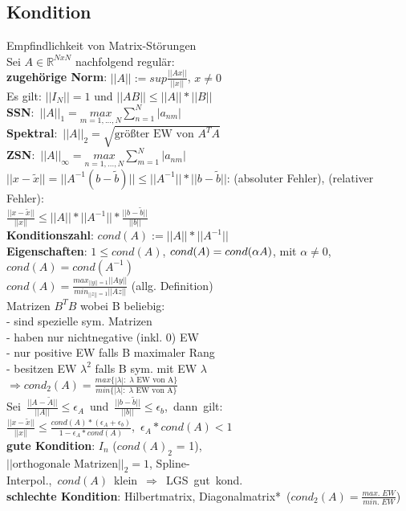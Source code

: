 \subsection{Kondition}
Empfindlichkeit von Matrix-Störungen\\
Sei $A \in \mathbb{R}^{NxN}$ nachfolgend regulär:\\
\textbf{zugehörige Norm}: $||A|| := sup\frac{||Ax||}{||x||}$, $x \neq 0$\\
Es gilt: $||I_N|| = 1$ und $||AB|| \leq ||A|| * ||B||$\\
\mbox{\textbf{SSN}: $||A||_1 = \underset{m = 1,...,N}{max}\sum_{n=1}^N|a_{nm}|$}\\
\mbox{\textbf{Spektral}: $||A||_2 = \sqrt{\text{größter EW von } A^TA}$}\\
\mbox{\textbf{ZSN}: $||A||_{\infty} = \underset{n=1,...,N}{max}\sum_{m=1}^N|a_{nm}|$}\\
${||x - \widetilde{x}}|| = ||A^{-1}(b - \widetilde{b})|| \leq ||A^{-1}|| * ||b-\widetilde{b}||$: (absoluter Fehler), (relativer Fehler):\\
$\frac{||x - \widetilde{x}||}{||x||} \leq ||A||*||A^{-1}||*\frac{||b-\widetilde{b}||}{||b||}$\\
\textbf{Konditionszahl}: $cond(A) := ||A||*||A^{-1}||$\\
\textbf{Eigenschaften}: $1 \leq cond(A)$, $cond(A) = \\cond(\alpha A)$, mit \mbox{$\alpha \neq 0$, $cond(A) = cond(A^{-1})$}\\
$cond(A) = \frac{max_{||y|| = 1}||Ay||}{min_{||z|| = 1}||Az||}$ (allg. Definition)\\
Matrizen $B^TB$ wobei B beliebig:\\
- sind spezielle sym. Matrizen\\
- haben nur nichtnegative (inkl. 0) EW\\
- nur positive EW falls B maximaler Rang\\
- besitzen EW $\lambda^2$ falls B sym. mit EW $\lambda$\\
$\Rightarrow cond_2(A) = \frac{max\{|\lambda|:\; \lambda \text{ EW von A}\}}{min\{|\lambda|:\; \lambda \text{ EW von A}\}}$\\
\mbox{Sei $\frac{||A-\widetilde{A}||}{||A||} \leq \epsilon_A$ und $\frac{||b-\widetilde{b}||}{||b||} \leq \epsilon_b$, dann gilt:}\\
\mbox{$\frac{||x-\widetilde{x}||}{||x||} \leq \frac{cond(A) * (\epsilon_A + \epsilon_b)}{1-\epsilon_A * cond(A)}$, $\epsilon_A * cond(A) < 1$}\\ 
\textbf{gute Kondition}: $I_n$ ($cond(A)_2$ = 1),\\ $||\text{orthogonale Matrizen}||_2 = 1$, Spline-\\ \mbox{Interpol., $cond(A)$ klein $\Rightarrow$ LGS gut kond.}\\
\textbf{schlechte Kondition}: Hilbertmatrix, \mbox{Diagonalmatrix* ($cond_2(A) = \frac{max.\; EW}{min.\; EW}$)}

